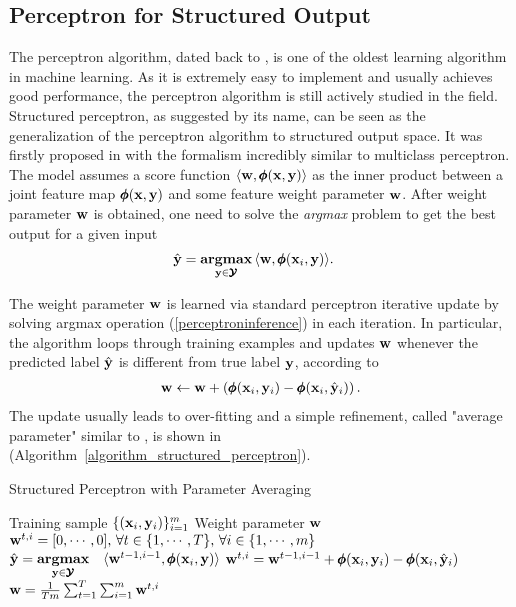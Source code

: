 {\subsection{Perceptron for Structured Output}

The perceptron algorithm, dated back to \citep{Rosenblatt58}, is one of the oldest learning algorithm in machine learning.
As it is extremely easy to implement and usually achieves good performance, the perceptron algorithm is still actively studied in the field.
Structured perceptron, as suggested by its name, can be seen as the generalization of the perceptron algorithm to structured output space.
It was firstly proposed in \citep{collins02a, collins02b} with the formalism incredibly similar to multiclass perceptron. 
The model assumes a score function $\langle \mathbf {w}, \pmb \phi(\mathbf {x},\mathbf {y}) \rangle$ as the inner product between a joint feature map $\pmb \phi(\mathbf {x},\mathbf {y})$ and some feature weight parameter $\mathbf {w}$.
After weight parameter $\mathbf {w}$ is obtained, one need to solve the \textit{argmax} problem to get the best output for a given input
\begin{align}
	\hat{\mathbf {y}} = \underset{\mathbf {y}\in\pmb {\mathcal{Y}}}{\textbf{argmax}} &\, \langle \mathbf {w}, \pmb \phi(\mathbf {x}_i,\mathbf {y}) \rangle.  \label{perceptroninference}
\end{align}

The weight parameter $\mathbf {w}$ is learned via standard perceptron iterative update by solving argmax operation (\ref{perceptroninference}) in each iteration.
In particular, the algorithm loops through training examples and updates $\mathbf {w}$ whenever the predicted label $\hat{\mathbf {y}}$ is different from true label $\mathbf {y}$, according to 
\begin{align*}
	\mathbf {w} \leftarrow \mathbf {w} + \left(\pmb \phi(\mathbf {x}_i,\mathbf {y}_i) - \pmb \phi(\mathbf {x}_i,\hat{\mathbf {y}}_i)\right).
\end{align*}
The update usually leads to over-fitting and a simple refinement, called "average parameter" similar to \citep{Freund99large}, is shown in (Algorithm~\ref{algorithm_structured_perceptron}).
\begin{algorithm}
\caption{Structured Perceptron with Parameter Averaging}
\label{algorithm_structured_perceptron}
\begin{algorithmic}[1]
	\REQUIRE Training sample $\lbrace (\mathbf {x}_i,\mathbf {y}_i)\rbrace_{i=1}^m$
	\ENSURE Weight parameter $\mathbf {w}$
	\STATE $\mathbf {w}^{t,i}=[0,\cdots,0],\,\forall t\in\{1,\cdots,T\},\,\forall i\in\{1,\cdots,m\}$
			\STATE $\hat{\mathbf {y}} = \underset{\mathbf {y}\in\pmb {\mathcal{Y}}}{\textbf{argmax}} \quad \langle \mathbf {w}^{t-1,i-1}, \pmb \phi(\mathbf {x}_i,\mathbf {y}) \rangle$
			\IF{$\hat{\vy}\neq\vy$}
				\STATE $\mathbf {w}^{t,i} = \mathbf {w}^{t-1,i-1} + \pmb \phi(\mathbf {x}_i,\mathbf {y}_i) - \pmb \phi(\mathbf {x}_i,\hat{\mathbf {y}}_i)$
			\ENDIF
		\ENDFOR
	\ENDFOR
	\RETURN $\mathbf {w} = \frac{1}{Tm}\sum_{t=1}^{T}\sum_{i=1}^{m}\mathbf {w}^{t,i}$
\end{algorithmic}
\end{algorithm}

}
